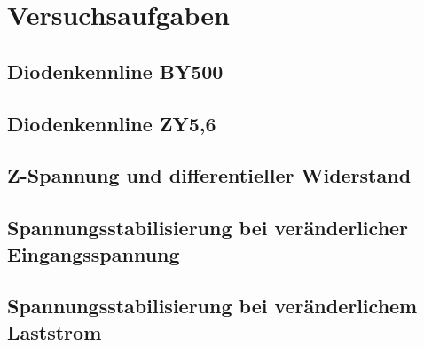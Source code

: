 \documentclass[a4paper, 12pt]{article}
\begin{document}
\section{Versuchsaufgaben}

\subsection{Diodenkennline BY500}

\subsection{Diodenkennline ZY5,6}

\subsection{Z-Spannung und differentieller Widerstand}

\subsection{Spannungsstabilisierung bei veränderlicher Eingangsspannung}

\subsection{Spannungsstabilisierung bei veränderlichem Laststrom}
\end{document}
